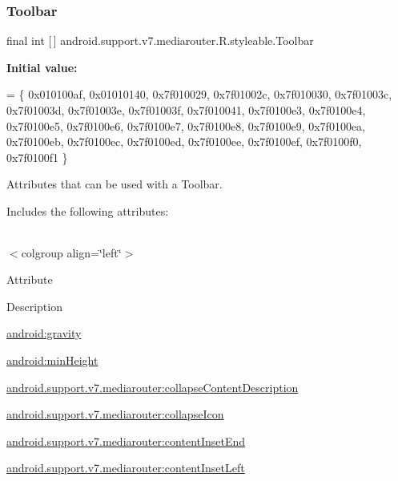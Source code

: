 \subsubsection{\texorpdfstring{Toolbar}{Toolbar}}
{\footnotesize\ttfamily final int \mbox{[}$\,$\mbox{]} android.\+support.\+v7.\+mediarouter.\+R.\+styleable.\+Toolbar\hspace{0.3cm}{\ttfamily [static]}}

{\bfseries Initial value\+:}
\begin{DoxyCode}
= \{
            0x010100af, 0x01010140, 0x7f010029, 0x7f01002c,
            0x7f010030, 0x7f01003c, 0x7f01003d, 0x7f01003e,
            0x7f01003f, 0x7f010041, 0x7f0100e3, 0x7f0100e4,
            0x7f0100e5, 0x7f0100e6, 0x7f0100e7, 0x7f0100e8,
            0x7f0100e9, 0x7f0100ea, 0x7f0100eb, 0x7f0100ec,
            0x7f0100ed, 0x7f0100ee, 0x7f0100ef, 0x7f0100f0,
            0x7f0100f1
        \}
\end{DoxyCode}
Attributes that can be used with a Toolbar. 

Includes the following attributes\+:

\tabulinesep=1mm
\begin{longtabu} spread 0pt [c]{*{0}{|X[-1]}|}
\hline
\end{longtabu}
$<$colgroup align=\char`\"{}left\char`\"{}$>$ 

Attribute

Description 

{\ttfamily \hyperlink{classandroid_1_1support_1_1v7_1_1mediarouter_1_1R_1_1styleable_a3d2dddda90688124695406ed25e401e5}{android\+:gravity}}

{\ttfamily \hyperlink{classandroid_1_1support_1_1v7_1_1mediarouter_1_1R_1_1styleable_a22666f41befa7bb4b75c5c670e5cc5ce}{android\+:min\+Height}}

{\ttfamily \hyperlink{classandroid_1_1support_1_1v7_1_1mediarouter_1_1R_1_1styleable_a9ee92a8c7ef0336e84eb2c6ea27db9d6}{android.\+support.\+v7.\+mediarouter\+:collapse\+Content\+Description}}

{\ttfamily \hyperlink{classandroid_1_1support_1_1v7_1_1mediarouter_1_1R_1_1styleable_a93c3561c7efd4ac1f04f5d87f57da44e}{android.\+support.\+v7.\+mediarouter\+:collapse\+Icon}}

{\ttfamily \hyperlink{classandroid_1_1support_1_1v7_1_1mediarouter_1_1R_1_1styleable_a8f713fe1fbe5422e426d843e644451f3}{android.\+support.\+v7.\+mediarouter\+:content\+Inset\+End}}

{\ttfamily \hyperlink{classandroid_1_1support_1_1v7_1_1mediarouter_1_1R_1_1styleable_a37a31055586c7afd817372e689144033}{android.\+support.\+v7.\+mediarouter\+:content\+Inset\+Left}}

